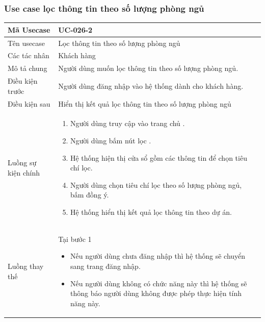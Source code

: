 \documentclass[12pt,a4paper]{article}
\begin{document}
    \subsubsection*{Use case lọc thông tin theo số lượng phòng ngủ}
    \begin{table}[H]
        \centering
        \begin{tabular}{|p{3.5cm}|p{11.5cm}|c|}
            \hline
            Mã Usecase      & UC-026-2                                               \\
            \hline
            Tên usecase     & Lọc thông tin theo số lượng phòng ngủ                  \\
            \hline
            Các tác nhân    & Khách hàng                                             \\
            \hline
            Mô tả chung     & Người dùng muốn lọc thông tin theo số lượng phòng ngủ. \\
            \hline

            Điều kiện trước & Người dùng đăng nhập vào hệ thống dành cho khách hàng. \\
            \hline

            Điều kiện sau   & Hiển thị kết quả lọc thông tin theo số lượng phòng ngủ \\
            \hline

            Luồng sự kiện chính & \vspace{-.8cm}\begin{enumerate}
                                                    \item Người dùng truy cập vào trang chủ .
                                                    \item Người dùng bấm nút lọc .
                                                    \item Hệ thống hiện thị cửa sổ gồm các thông tin để chọn tiêu chí lọc.
                                                    \item Người dùng chọn tiêu chí lọc theo số lượng phòng ngủ, bấm đồng ý.
                                                    \item Hệ thống hiển thị kết quả lọc thông tin theo dự án.
            \end{enumerate}
            \\
            \hline
            Luồng thay thế & Tại bước 1\newline
            \vspace{-.8cm}\begin{itemize}
                              \item Nếu người dùng chưa đăng nhập thì hệ thống sẽ chuyển sang trang đăng nhập.
                              \item Nếu người dùng không có chức năng này thì hệ thống sẽ thông báo người dùng không được phép thực hiện tính năng này.
            \end{itemize}


\end{tabular}
\end{table}
\end{document}
